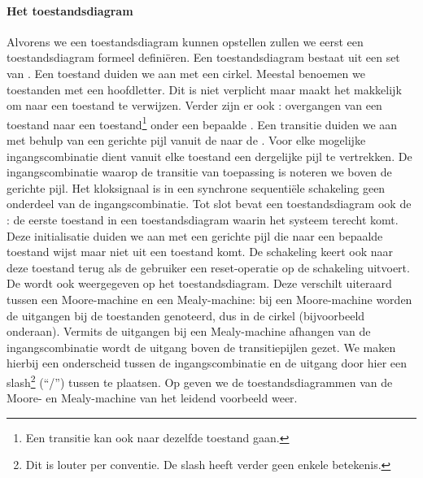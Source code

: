 \paragraph{Het toestandsdiagram} Alvorens we een toestandsdiagram kunnen opstellen zullen we eerst een toestandsdiagram formeel defini\"eren. Een toestandsdiagram bestaat uit een set van . Een toestand duiden we aan met een cirkel. Meestal benoemen we toestanden met een hoofdletter. Dit is niet verplicht maar maakt het makkelijk om naar een toestand te verwijzen. Verder zijn er ook : overgangen van een toestand naar een toestand\footnote{Een transitie kan ook naar dezelfde toestand gaan.} onder een bepaalde . Een transitie duiden we aan met behulp van een gerichte pijl vanuit de  naar de . Voor elke mogelijke ingangscombinatie dient vanuit elke toestand een dergelijke pijl te vertrekken. De ingangscombinatie waarop de transitie van toepassing is noteren we boven de gerichte pijl. Het kloksignaal is in een synchrone sequenti\"ele schakeling geen onderdeel van de ingangscombinatie. Tot slot bevat een toestandsdiagram ook de : de eerste toestand in een toestandsdiagram waarin het systeem terecht komt. Deze initialisatie duiden we aan met een gerichte pijl die naar een bepaalde toestand wijst maar niet uit een toestand komt. De schakeling keert ook naar deze toestand terug als de gebruiker een reset-operatie op de schakeling uitvoert. De  wordt ook weergegeven op het toestandsdiagram. Deze verschilt uiteraard tussen een Moore-machine en een Mealy-machine: bij een Moore-machine worden de uitgangen bij de toestanden genoteerd, dus in de cirkel (bijvoorbeeld onderaan). Vermits de uitgangen bij een Mealy-machine afhangen van de ingangscombinatie wordt de uitgang boven de transitiepijlen gezet. We maken hierbij een onderscheid tussen de ingangscombinatie en de uitgang door hier een slash\footnote{Dit is louter per conventie. De slash heeft verder geen enkele betekenis.} (``/'') tussen te plaatsen. Op  geven we de toestandsdiagrammen van de Moore- en Mealy-machine van het leidend voorbeeld weer.

